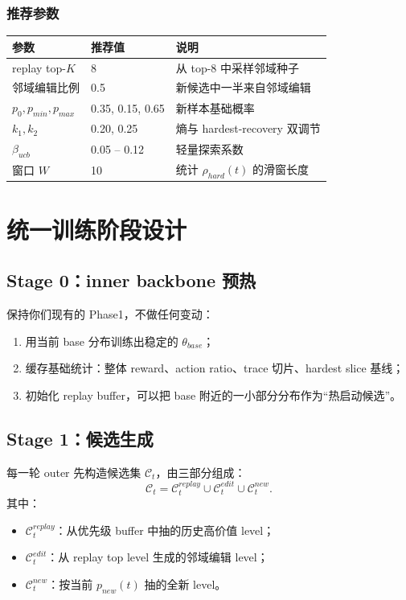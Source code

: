 \documentclass[11pt,a4paper]{ctexart}
\begin{document}
\subsubsection*{推荐参数}
\begin{center}
\begin{tabular}{p{4.0cm}p{3.0cm}p{6.4cm}}
\toprule
参数 & 推荐值 & 说明 \\
\midrule
replay top-\(K\) & 8 & 从 top-8 中采样邻域种子 \\
邻域编辑比例 & 0.5 & 新候选中一半来自邻域编辑 \\
\(p_0,p_{min},p_{max}\) & 0.35, 0.15, 0.65 & 新样本基础概率 \\
\(k_1,k_2\) & 0.20, 0.25 & 熵与 hardest-recovery 双调节 \\
\(\beta_{ucb}\) & 0.05 -- 0.12 & 轻量探索系数 \\
窗口 \(W\) & 10 & 统计 \(\rho_{hard}(t)\) 的滑窗长度 \\
\bottomrule
\end{tabular}
\end{center}

\section{统一训练阶段设计}

\subsection{Stage 0：inner backbone 预热}
保持你们现有的 Phase1，不做任何变动：
\begin{enumerate}[leftmargin=2.2em,itemsep=0.25em]
    \item 用当前 base 分布训练出稳定的 \(\theta_{base}\)；
    \item 缓存基础统计：整体 reward、action ratio、trace 切片、hardest slice 基线；
    \item 初始化 replay buffer，可以把 base 附近的一小部分分布作为“热启动候选”。
\end{enumerate}

\subsection{Stage 1：候选生成}
每一轮 outer 先构造候选集 \(\mathcal{C}_t\)，由三部分组成：
\begin{equation}
\mathcal{C}_t = \mathcal{C}^{replay}_t \cup \mathcal{C}^{edit}_t \cup \mathcal{C}^{new}_t.
\label{eq:candidates}
\end{equation}
其中：
\begin{itemize}[leftmargin=2.2em,itemsep=0.2em]
    \item \(\mathcal{C}^{replay}_t\)：从优先级 buffer 中抽的历史高价值 level；
    \item \(\mathcal{C}^{edit}_t\)：从 replay top level 生成的邻域编辑 level；
    \item \(\mathcal{C}^{new}_t\)：按当前 \(p_{new}(t)\) 抽的全新 level。
\end{itemize}
\end{document}
